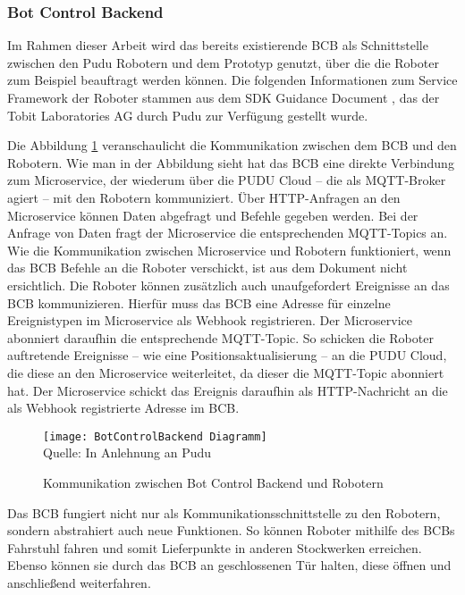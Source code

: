 \subsubsection{Bot Control Backend}\label{sec:BotControlBackend}
Im Rahmen dieser Arbeit wird das bereits existierende \ac{BCB} als Schnittstelle zwischen den Pudu Robotern und dem Prototyp genutzt, über die die Roboter zum Beispiel beauftragt werden können. Die folgenden Informationen zum Service Framework der Roboter stammen aus dem SDK Guidance Document \cite{PuduSDK}, das der Tobit Laboratories AG durch Pudu zur Verfügung gestellt wurde.

Die Abbildung \ref{fig:BotControlBackendCommunication} veranschaulicht die Kommunikation zwischen dem \ac{BCB} und den Robotern. Wie man in der Abbildung sieht hat das \ac{BCB} eine direkte Verbindung zum \gls{Microservice}, der wiederum über die PUDU Cloud – die als \gls{MQTT-Broker} agiert – mit den Robotern kommuniziert. Über \gls{HTTP}-Anfragen an den \gls{Microservice} können Daten abgefragt und Befehle gegeben werden. Bei der Anfrage von Daten fragt der \gls{Microservice} die entsprechenden \gls{MQTT}-Topics an. Wie die Kommunikation zwischen \gls{Microservice} und Robotern funktioniert, wenn das \ac{BCB} Befehle an die Roboter verschickt, ist aus dem Dokument nicht ersichtlich. Die Roboter können zusätzlich auch unaufgefordert Ereignisse an das \ac{BCB} kommunizieren. Hierfür muss das \ac{BCB} eine Adresse für einzelne Ereignistypen im \gls{Microservice} als \gls{Webhook} registrieren. Der \gls{Microservice} abonniert daraufhin die entsprechende \gls{MQTT-Topic}. So schicken die Roboter auftretende Ereignisse – wie eine Positionsaktualisierung – an die PUDU Cloud, die diese an den \gls{Microservice} weiterleitet, da dieser die \gls{MQTT-Topic} abonniert hat. Der \gls{Microservice} schickt das Ereignis daraufhin als \gls{HTTP}-Nachricht an die als \gls{Webhook} registrierte Adresse im \ac{BCB}.

\begin{figure}[H]
    \caption{Kommunikation zwischen Bot Control Backend und Robotern}\label{fig:BotControlBackendCommunication}
    \texttt{[image: BotControlBackend Diagramm]}
    \\
    Quelle: In Anlehnung an Pudu \cite[S.~4]{PuduSDK}
\end{figure}

Das \ac{BCB} fungiert nicht nur als Kommunikationsschnittstelle zu den Robotern, sondern abstrahiert auch neue Funktionen. So können Roboter mithilfe des \ac{BCB}s Fahrstuhl fahren und somit Lieferpunkte in anderen Stockwerken erreichen. Ebenso können sie durch das \ac{BCB} an geschlossenen Tür halten, diese öffnen und anschließend weiterfahren.

